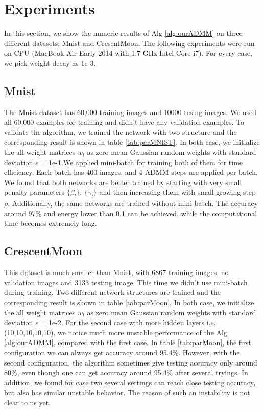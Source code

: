 \documentclass[letterpaper, 10 pt, conference]{ieeeconf}  %
\begin{document}
\section{Experiments} \label{experiment}
In this section, we show the numeric results of Alg \ref{alg:ourADMM} on three different datasets: Mnist and CresentMoon. The following experiments were run on CPU (MacBook Air Early 2014 with 1,7 GHz Intel Core i7). For every case, we pick weight decay as 1e-3.

\subsection{Mnist}
The Mnist dataset has 60,000 training images and 10000 tesing images. We used all 60,000 examples for training and didn't have any validation examples. To validate the algorithm, we trained the network with two structure and the corresponding result is shown in table  \ref{tab:parMNIST}.  In both case, we initialize the all weight matrices $w_l$ as zero mean Gaussian random weights with standard deviation $\epsilon$ = 1e-1.We applied mini-batch for training both of them for time efficiency. Each batch has 400 images, and 4 ADMM steps are applied per batch. We found that both networks are better trained by starting with very small penalty parameters $\{\beta_l\}$, $\{\gamma_l\}$ and then increasing them with small growing step $\rho$. Additionally, the same networks are trained without mini batch. The accuracy around 97\% and energy lower than 0.1 can be achieved, while the computational time becomes extremely long.

\subsection{CrescentMoon}
This dataset is much smaller than Mnist, with 6867 training images, no validation images and 3133 testing image. This time we didn't use mini-batch during training. Two different network structures are trained and the corresponding result is shown in table  \ref{tab:parMoon}. In both case, we initialize the all weight matrices $w_l$ as zero mean Gaussian random weights with standard deviation $\epsilon$ = 1e-2. For the second case with more hidden layers i.e. (10,10,10,10,10), we notice much more unstable performance of the Alg \ref{alg:ourADMM}, compared with the first case. In table \ref{tab:parMoon}, the first configuration we can always get accuracy around 95.4\%. However, with the second configuration, the algorithm sometimes give testing accuracy only around 80\%, even though one can get accuracy around 95.4\% after several tryings.  In addition, we found for case two several settings can reach close testing accuracy, but also has similar unstable behavior. The reason of such an instability is not clear to us yet.
\end{document}
